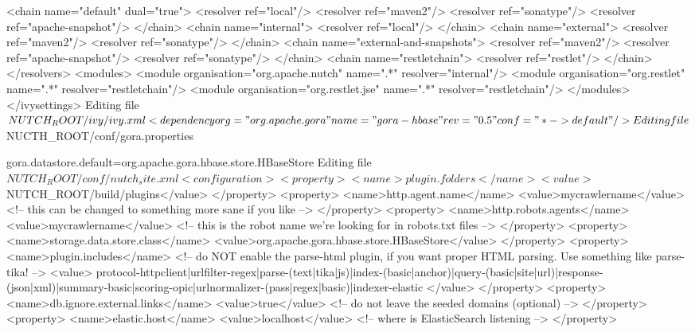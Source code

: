 {    <chain name="default" dual="true">
      <resolver ref="local"/>
      <resolver ref="maven2"/>
      <resolver ref="sonatype"/>
      <resolver ref="apache-snapshot"/>
    </chain>
    <chain name="internal">
      <resolver ref="local"/>
    </chain>
    <chain name="external">
      <resolver ref="maven2"/>
      <resolver ref="sonatype"/>
    </chain>
    <chain name="external-and-snapshots">
      <resolver ref="maven2"/>
      <resolver ref="apache-snapshot"/>
      <resolver ref="sonatype"/>
    </chain>
    <chain name="restletchain">
      <resolver ref="restlet"/>
    </chain>
  </resolvers>
  <modules>
    <module organisation="org.apache.nutch" name=".*" resolver="internal"/>
    <module organisation="org.restlet" name=".*" resolver="restletchain"/>
    <module organisation="org.restlet.jse" name=".*" resolver="restletchain"/>
  </modules>
</ivysettings>
Editing file $NUTCH_ROOT/ivy/ivy.xml

<dependency org="org.apache.gora" name="gora-hbase" rev="0.5" conf="*->default" />
Editing file $NUCTH_ROOT/conf/gora.properties

gora.datastore.default=org.apache.gora.hbase.store.HBaseStore
Editing file $NUTCH_ROOT/conf/nutch_site.xml

<configuration>
<property>
   <name>plugin.folders</name>
   <value>$NUTCH_ROOT/build/plugins</value>
 </property>
<property>
        <name>http.agent.name</name>
        <value>mycrawlername</value>
        <!-- this can be changed to something more sane if you like -->
    </property>
    <property>
        <name>http.robots.agents</name>
        <value>mycrawlername</value>
        <!-- this is the robot name we're looking for in robots.txt files -->
    </property>
    <property>
        <name>storage.data.store.class</name>
        <value>org.apache.gora.hbase.store.HBaseStore</value>
    </property>
    <property>
        <name>plugin.includes</name>
        <!-- do \*\*NOT\*\* enable the parse-html plugin, if you want proper HTML parsing. Use something like parse-tika! -->
        <value>
            protocol-httpclient|urlfilter-regex|parse-(text|tika|js)|index-(basic|anchor)|query-(basic|site|url)|response-(json|xml)|summary-basic|scoring-opic|urlnormalizer-(pass|regex|basic)|indexer-elastic
        </value>
    </property>
    <property>
        <name>db.ignore.external.links</name>
        <value>true</value>
        <!-- do not leave the seeded domains (optional) -->
    </property>
    <property>
        <name>elastic.host</name>
        <value>localhost</value>
        <!-- where is ElasticSearch listening -->
    </property>

}
